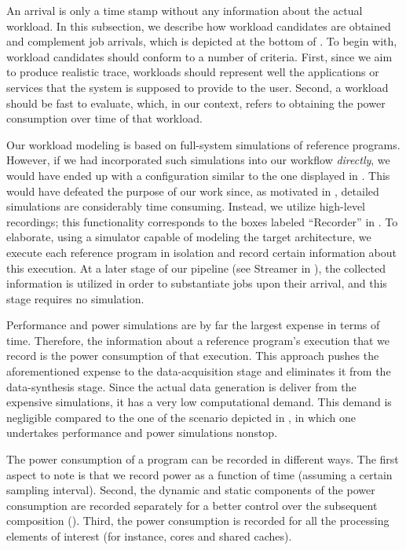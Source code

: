 An arrival is only a time stamp without any information about the actual
workload. In this subsection, we describe how workload candidates are obtained
and complement job arrivals, which is depicted at the bottom of
. To begin with, workload candidates should conform to a
number of criteria. First, since we aim to produce realistic trace, workloads
should represent well the applications or services that the system is supposed
to provide to the user. Second, a workload should be fast to evaluate, which, in
our context, refers to obtaining the power consumption over time of that
workload.

Our workload modeling is based on full-system simulations of reference programs.
However, if we had incorporated such simulations into our workflow
\emph{directly}, we would have ended up with a configuration similar to the one
displayed in . This would have defeated the purpose of our
work since, as motivated in , detailed simulations are
considerably time consuming. Instead, we utilize high-level recordings; this
functionality corresponds to the boxes labeled ``Recorder'' in
. To elaborate, using a simulator capable of modeling the
target architecture, we execute each reference program in isolation and record
certain information about this execution. At a later stage of our pipeline (see
Streamer in ), the collected information is utilized in order
to substantiate jobs upon their arrival, and this stage requires no simulation.

Performance and power simulations are by far the largest expense in terms of
time. Therefore, the information about a reference program's execution that we
record is the power consumption of that execution. This approach pushes the
aforementioned expense to the data-acquisition stage and eliminates it from the
data-synthesis stage. Since the actual data generation is deliver from the
expensive simulations, it has a very low computational demand. This demand is
negligible compared to the one of the scenario depicted in ,
in which one undertakes performance and power simulations nonstop.

The power consumption of a program can be recorded in different ways. The first
aspect to note is that we record power as a function of time (assuming a certain
sampling interval). Second, the dynamic and static components of the power
consumption are recorded separately for a better control over the subsequent
composition (). Third, the power consumption is recorded for
all the processing elements of interest (for instance, cores and shared caches).

